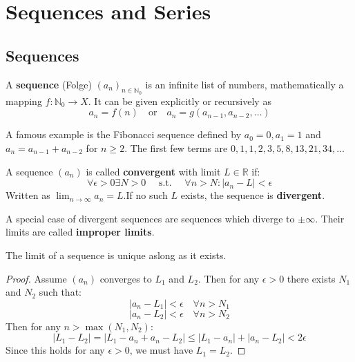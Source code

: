 \section{Sequences and Series}

\subsection{Sequences}

\begin{definition}
    A \textbf{sequence} (Folge) $(a_n)_{n \in \mathbb{N}_0}$ is an infinite list of numbers, mathematically a mapping $f: \mathbb{N}_0 \to X$. It can be given explicitly or recursively  as
    $$a_n = f(n) \quad \text{or} \quad a_n = g(a_{n-1}, a_{n-2}, \dots)$$
\end{definition}

\begin{example}
    A famous example is the Fibonacci sequence defined by $a_0 = 0, a_1 = 1$ and $a_n = a_{n-1} + a_{n-2}$ for $n \ge 2$.
    The first few terms are $0, 1, 1, 2, 3, 5, 8, 13, 21, 34, \dots$
\end{example}

\begin{definition}
    A sequence $(a_n)$ is called \textbf{convergent} with limit $L \in \mathbb{R}$ if:
    $$\forall \epsilon \gt 0 \exists N \gt 0 \quad \text{ s.t. } \quad \forall n \gt N : |a_n - L| \lt \epsilon$$
    Written as $\lim_{n \to \infty} a_n = L$.If no such $L$ exists, the sequence is \textbf{divergent}. 
\end{definition}

\begin{remark}
    A special case of divergent sequences are sequences which diverge to $\pm \infty$. Their limits are called \textbf{improper limits}.
\end{remark}

\begin{theorem}
    The limit of a sequence is unique aslong as it exists.
\end{theorem}

\begin{proof}
    Assume $(a_n)$ converges to $L_1$ and $L_2$.
    Then for any $\epsilon > 0$ there exists $N_1$ and $N_2$ such that:
    $$|a_n - L_1| < \epsilon \quad \forall n > N_1$$
    $$|a_n - L_2| < \epsilon \quad \forall n > N_2$$
    Then for any $n > \max(N_1, N_2)$:
    $$|L_1 - L_2| = |L_1 - a_n + a_n - L_2| \le |L_1 - a_n| + |a_n - L_2| < 2\epsilon$$
    Since this holds for any $\epsilon > 0$, we must have $L_1 = L_2$.
\end{proof}

